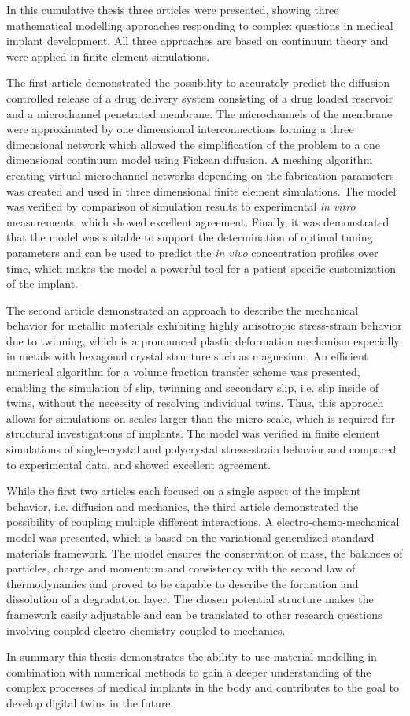 In this cumulative thesis three articles were presented, showing three mathematical modelling approaches responding to complex questions in medical implant development. All three approaches are based on continuum theory and were applied in finite element simulations. 

The first article demonstrated the possibility to accurately predict the diffusion controlled release of a drug delivery system consisting of a drug loaded reservoir and a microchannel penetrated membrane. The microchannels of the membrane were approximated by one dimensional interconnections forming a three dimensional network which allowed the simplification of the problem to a one dimensional continuum model using Fickean diffusion. A meshing algorithm creating virtual microchannel networks depending on the fabrication parameters was created and used in three dimensional finite element simulations. The model was verified by comparison of simulation results to experimental \textit{in vitro} measurements, which showed excellent agreement. Finally, it was demonstrated that the model was suitable to support the determination of optimal tuning parameters and can be used to predict the \textit{in vivo} concentration profiles over time, which makes the model a powerful tool for a patient specific customization of the implant.

The second article demonstrated an approach to describe the mechanical behavior for metallic materials exhibiting highly anisotropic stress-strain behavior due to twinning, which is a pronounced plastic deformation mechanism especially in metals with hexagonal crystal structure such as magnesium. An efficient numerical algorithm for a volume fraction transfer scheme was presented, enabling the simulation of slip, twinning and secondary slip, i.e. slip inside of twins, without the necessity of resolving individual twins. Thus, this approach allows for simulations on scales larger than the micro-scale, which is required for structural investigations of implants. The model was verified in finite element simulations of single-crystal and polycrystal stress-strain behavior and compared to experimental data, and showed excellent agreement.  

While the first two articles each focused on a single aspect of the implant behavior, i.e. diffusion and mechanics, the third article demonstrated the possibility of coupling multiple different interactions. A electro-chemo-mechanical model was presented, which is based on the variational generalized standard materials framework. The model ensures the conservation of mass, the balances of particles, charge and momentum and consistency with the second law of thermodynamics and proved to be capable to describe the formation and dissolution of a degradation layer. The chosen potential structure makes the framework easily adjustable and can be translated to other research questions involving coupled electro-chemistry coupled to mechanics. 

In summary this thesis demonstrates the ability to use material modelling in combination with numerical methods to gain a deeper understanding of the complex processes of medical implants in the body and contributes to the goal to develop digital twins in the future. 